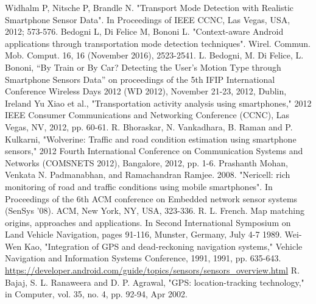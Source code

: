 \documentclass[12pt,a4paper,openright,twoside]{report}
\renewcommand{\chaptermark}[1]{\markboth{\thechapter.\ #1}{}}
\begin{document}
\renewcommand{\chaptermark}[1]{\markright{\thechapter \ #1}{}}
\lhead[\fancyplain{}{\bfseries\thepage}]{\fancyplain{}{\bfseries\rightmark}}

\begin{thebibliography}{90}             %
\rhead[\fancyplain{}{\bfseries \leftmark}]{\fancyplain{}{\bfseries
\thepage}}
 Widhalm P, Nitsche P, Brandle N. "Transport Mode Detection with Realistic Smartphone Sensor Data". In Proceedings of IEEE CCNC, Las Vegas, USA, 2012; 573-576.
 Bedogni L, Di Felice M, Bononi L. "Context-aware Android applications through transportation mode detection techniques". Wirel. Commun. Mob. Comput. 16, 16 (November 2016), 2523-2541.
 L. Bedogni, M. Di Felice, L. Bononi, “By Train or By Car? Detecting the User’s Motion Type through Smartphone Sensors Data” on proceedings of the 5th IFIP International Conference Wireless Days 2012 (WD 2012), November 21-23, 2012, Dublin, Ireland
 Yu Xiao et al., "Transportation activity analysis using smartphones," 2012 IEEE Consumer Communications and Networking Conference (CCNC), Las Vegas, NV, 2012, pp. 60-61.
 R. Bhoraskar, N. Vankadhara, B. Raman and P. Kulkarni, "Wolverine: Traffic and road condition estimation using smartphone sensors," 2012 Fourth International Conference on Communication Systems and Networks (COMSNETS 2012), Bangalore, 2012, pp. 1-6.
 Prashanth Mohan, Venkata N. Padmanabhan, and Ramachandran Ramjee. 2008. "Nericell: rich monitoring of road and traffic conditions using mobile smartphones". In Proceedings of the 6th ACM conference on Embedded network sensor systems (SenSys '08). ACM, New York, NY, USA, 323-336.
 R. L. French. Map matching origins, approaches and applications. In Second International Symposium on Land Vehicle Navigation, pages 91-116,
Munster, Germany, July 4-7 1989.
 Wei-Wen Kao, "Integration of GPS and dead-reckoning navigation systems," Vehicle Navigation and Information Systems Conference, 1991, 1991, pp. 635-643.
 \url{https://developer.android.com/guide/topics/sensors/sensors_overview.html}
 R. Bajaj, S. L. Ranaweera and D. P. Agrawal, "GPS: location-tracking technology," in Computer, vol. 35, no. 4, pp. 92-94, Apr 2002.

\end{thebibliography}
\end{document}
